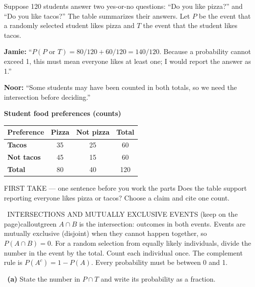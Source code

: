 \documentclass[11pt]{article}
\begin{document}
\clearpage
{}

Suppose 120 students answer two yes-or-no questions: ``Do you like pizza?'' and ``Do you like tacos?'' The table summarizes their answers. Let $P$ be the event that a randomly selected student likes pizza and $T$ the event that the student likes tacos.\par\smallskip \textbf{Jamie:} ``$P(P\text{ or }T)=80/120+60/120=140/120$. Because a probability cannot exceed 1, this must mean everyone likes at least one; I would report the answer as 1.''\par \textbf{Noor:} ``Some students may have been counted in both totals, so we need the intersection before deciding.''\par
\begin{center}
\textbf{Student food preferences (counts)}\par\smallskip
\begin{tabular}{|l|c|c|c|}
\hline
\textbf{Preference} & \textbf{Pizza} & \textbf{Not pizza} & \textbf{Total} \\ \hline
\textbf{Tacos} & 35 & 25 & 60 \\ \hline
\textbf{Not tacos} & 45 & 15 & 60 \\ \hline
\textbf{Total} & 80 & 40 & 120 \\ \hline
\end{tabular}
\end{center}
\begin{firsttakebox}{FIRST TAKE --- one sentence before you work the parts}
Does the table support reporting everyone likes pizza or tacos? Choose a claim and cite one count.\par
{}
\end{firsttakebox}

\begin{callout}{\IconBook\ INTERSECTIONS AND MUTUALLY EXCLUSIVE EVENTS (keep on the page)}{calloutgreen}
$A\cap B$ is the intersection: outcomes in both events. Events are mutually exclusive (disjoint) when they cannot happen together, so $P(A\cap B)=0$. For a random selection from equally likely individuals, divide the number in the event by the total. Count each individual once. The complement rule is $P(A^c)=1-P(A)$. Every probability must be between 0 and 1.
\end{callout}

~\textbf{(a)} State the number in $P\cap T$ and write its probability as a fraction.\par
{}
\end{document}
